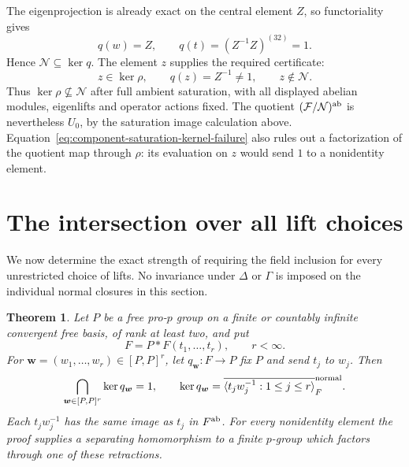 \documentclass[11pt]{article}
\newtheorem{theorem}{Theorem}[section]
\theoremstyle{definition}\newtheorem{definition}[theorem]{Definition}
\begin{document}
The eigenprojection is already exact on the central element $Z$,
so functoriality gives
\[
 q(w)=Z,\qquad q(t)=(Z^{-1}Z)^{(32)}=1.
\]
Hence $\mathcal N\subseteq\ker q$.  The element $z$ supplies
the required certificate:
\begin{equation}\label{eq:component-saturation-kernel-failure}
 z\in\ker\rho,\qquad q(z)=Z^{-1}\ne1,
 \qquad z\notin\mathcal N.
\end{equation}
Thus $\ker\rho\nsubseteq\mathcal N$ after full ambient
saturation, with all displayed abelian modules, eigenlifts and
operator actions fixed.  The quotient
$(\mathcal F/\mathcal N)^{\rm ab}$ is nevertheless $U_0$,
by the saturation image calculation above.
Equation~\eqref{eq:component-saturation-kernel-failure} also
rules out a factorization of the quotient map through $\rho$:
its evaluation on $z$ would send $1$ to a nonidentity element.

%


\section{The intersection over all lift choices}
\label{sec:all-lift-intersection}

We now determine the exact strength of requiring the field inclusion
for every unrestricted choice of lifts.  No invariance under
$\Delta$ or $\Gamma$ is imposed on the individual normal closures
in this section.

\begin{theorem}\label{thm:all-lift-intersection}
Let $P$ be a free pro-$p$ group on a finite or countably infinite
convergent free basis, of rank at least two, and put
\[
 F=P*F(t_1,\ldots,t_r),\qquad r<\infty.
\]
For $\boldsymbol w=(w_1,\ldots,w_r)\in[P,P]^r$, let
$q_{\boldsymbol w}:F\to P$ fix $P$ and send $t_j$ to $w_j$.
Then
\[
 \bigcap_{\boldsymbol w\in[P,P]^r}\ker q_{\boldsymbol w}=1,
 \qquad
 \ker q_{\boldsymbol w}
   =\overline{\langle t_jw_j^{-1}:1\leq j\leq r\rangle}^{\rm normal}_F.
\]
Each $t_jw_j^{-1}$ has the same image as $t_j$ in $F^{\rm ab}$.
For every nonidentity element the proof supplies a separating
homomorphism to a finite $p$-group which factors through one of
these retractions.
\end{theorem}
\end{document}
